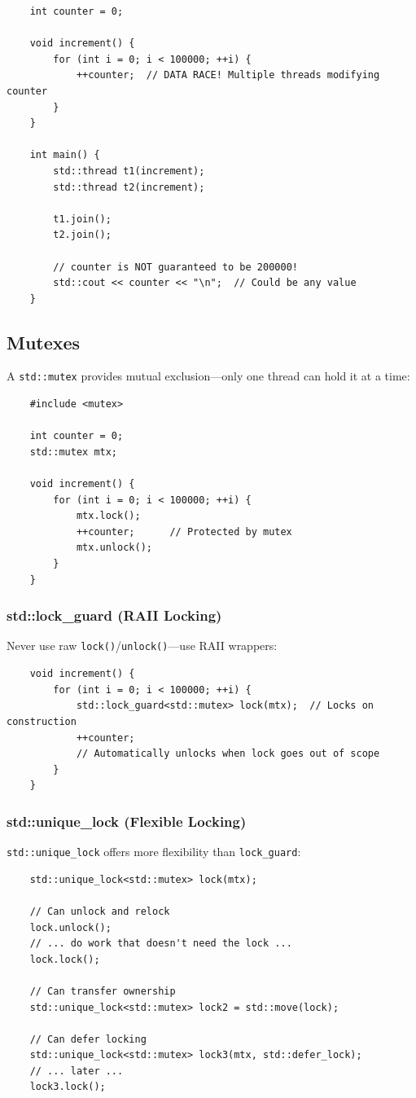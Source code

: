 \begin{lstlisting}
	int counter = 0;
	
	void increment() {
		for (int i = 0; i < 100000; ++i) {
			++counter;  // DATA RACE! Multiple threads modifying counter
		}
	}
	
	int main() {
		std::thread t1(increment);
		std::thread t2(increment);
		
		t1.join();
		t2.join();
		
		// counter is NOT guaranteed to be 200000!
		std::cout << counter << "\n";  // Could be any value
	}
\end{lstlisting}

\subsection{Mutexes}

A \texttt{std::mutex} provides mutual exclusion—only one thread can hold it at a time:

\begin{lstlisting}
	#include <mutex>
	
	int counter = 0;
	std::mutex mtx;
	
	void increment() {
		for (int i = 0; i < 100000; ++i) {
			mtx.lock();
			++counter;      // Protected by mutex
			mtx.unlock();
		}
	}
\end{lstlisting}

\subsubsection{std::lock\_guard (RAII Locking)}

Never use raw \texttt{lock()}/\texttt{unlock()}—use RAII wrappers:

\begin{lstlisting}
	void increment() {
		for (int i = 0; i < 100000; ++i) {
			std::lock_guard<std::mutex> lock(mtx);  // Locks on construction
			++counter;
			// Automatically unlocks when lock goes out of scope
		}
	}
\end{lstlisting}

\subsubsection{std::unique\_lock (Flexible Locking)}

\texttt{std::unique\_lock} offers more flexibility than \texttt{lock\_guard}:

\begin{lstlisting}
	std::unique_lock<std::mutex> lock(mtx);
	
	// Can unlock and relock
	lock.unlock();
	// ... do work that doesn't need the lock ...
	lock.lock();
	
	// Can transfer ownership
	std::unique_lock<std::mutex> lock2 = std::move(lock);
	
	// Can defer locking
	std::unique_lock<std::mutex> lock3(mtx, std::defer_lock);
	// ... later ...
	lock3.lock();
\end{lstlisting}

